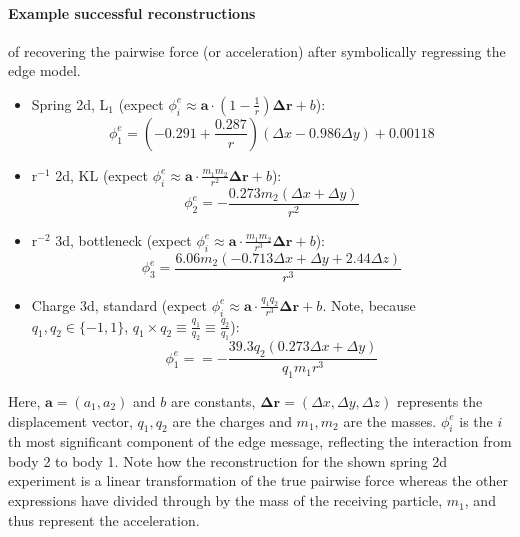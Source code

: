 \documentclass[11pt]{article}
\begin{document}
\paragraph*{Example successful reconstructions} of recovering the pairwise force (or acceleration) after symbolically regressing the edge model.
    \begin{itemize}
        \item
        Spring 2d, L$_1$ (expect $\phi^{e}_i \approx \mathbf{a} \cdot (1-\frac{1}{r}) \mathbf{\Delta {r}} + b$):
        $$
        \phi^{e}_1 = (-0.291 + \frac{0.287}{r})(\Delta x - 0.986 \Delta y) + 0.00118
        $$
        \item
        r$^{-1}$ 2d, KL (expect $\phi^{e}_i \approx \mathbf{a} \cdot \frac{m_1 m_2}{r^2} \mathbf{\Delta r} + b$):
        $$\phi^{e}_2 = -\frac{0.273m_2(\Delta x + \Delta y)}{r^2}$$
        \item
        r$^{-2}$ 3d, bottleneck (expect $\phi^{e}_i \approx \mathbf{a} \cdot \frac{m_1 m_2}{r^3} \mathbf{\Delta r} + b$):
        $$\phi^{e}_3 = \frac{6.06m_2(-0.713\Delta x + \Delta y + 2.44\Delta z)}{r^3}$$
        \item
        Charge 3d, standard (expect $\phi^{e}_i \approx \mathbf{a} \cdot \frac{q_1 q_2}{r^3} \mathbf{\Delta r} + b$. Note, because $q_1, q_2 \in \{-1, 1\}$, $q_1 \times q_2 \equiv \frac{q_1}{q_2} \equiv \frac{q_2}{q_1}$):
        $$\phi^{e}_1 = = -\frac{39.3q_2(0.273\Delta x + \Delta y)}{ q_1 m_1r^3}$$
    \end{itemize}
    Here, $\mathbf{a} = (a_1, a_2)$ and $b$ are constants, $\mathbf{\Delta r} = (\Delta x, \Delta y, \Delta z)$ represents the displacement vector, $q_1, q_2$ are the charges and $m_1, m_2$ are the masses. $\phi^{e}_i$ is the $i$th most significant component of the edge message, reflecting the interaction from body 2 to body 1. Note how the reconstruction for the shown spring 2d experiment is a linear transformation of the true pairwise force whereas the other expressions have divided through by the mass of the receiving particle, $m_1$, and thus represent the acceleration.
\end{document}
